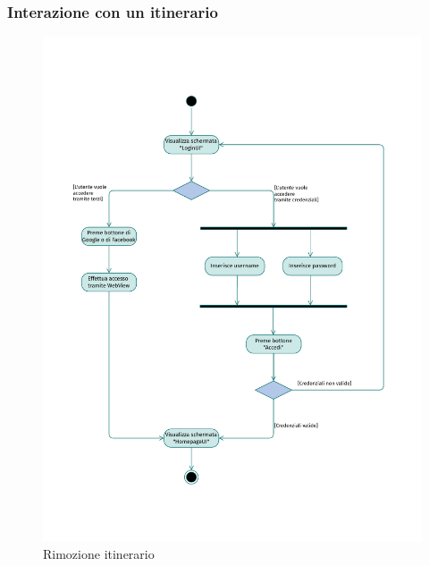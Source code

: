\documentclass{natourDoc}
\begin{document}
% 	

\newpage
\subsubsection{Interazione con un itinerario}

\newpage
\begin{figure}[!htbp]
	\centering
	\includegraphics[width=\textwidth, page=10]{./diagrams/activity.pdf}
	\caption{Rimozione itinerario}
\end{figure}
\FloatBarrier
\end{document}
